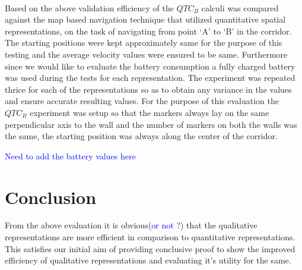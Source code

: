 \paragraph{}Based on the above validation efficiency of the $QTC_B$ calculi was compared against the map based navigation technique that utilized quantitative spatial representations, on the task of navigating from point `A' to `B' in the corridor. The starting positions were kept approximately same for the purpose of this testing and the average velocity values were ensured to be same. Furthermore since we would like to evaluate the battery consumption a fully charged battery was used during the tests for each representation. The experiment was repeated thrice for each of the representations so as to obtain any variance in the values and ensure accurate resulting values. For the purpose of this evaluation the $QTC_B$ experiment was setup so that the markers always lay on the same perpendicular axis to the wall and the number of markers on both the walls was the same, the starting position was always along the center of the corridor.



\textcolor{blue}{Need to add the battery values here}

\section{Conclusion}
From the above evaluation it is obvious(\textcolor{blue}{or not ?}) that the qualitative representations are more efficient in comparison to quantitative representations. This satisfies our initial aim of providing conclusive proof to show the improved efficiency of qualitative representations and evaluating it's utility for the same.
